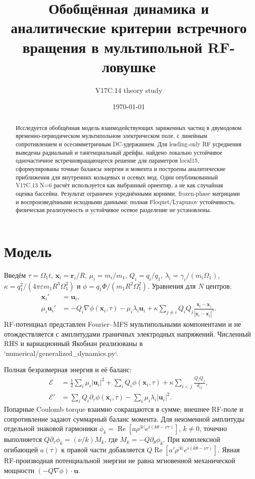\documentclass[11pt,a4paper]{article}
\title{Обобщённая динамика и аналитические критерии встречного вращения в мультипольной RF-ловушке}
\author{V17C.14 theory study}
\date{\today}
\begin{document}
\maketitle

\begin{abstract}
Исследуется обобщённая модель взаимодействующих заряженных частиц в двумодовом временно-периодическом мультипольном электрическом поле, с линейным сопротивлением и осесимметричным DC-удержанием. Для leading-only RF усреднения выведены радиальный и тангенциальный дрейфы, найдено локально устойчивое одночастичное встречновращающееся решение для параметров local15, сформулированы точные балансы энергии и момента и построены аналитические приближения для внутренних кольцевых и осевых мод. Один опубликованный V17C.13 N=6 расчёт используется как выбранный ориентир, а не как случайная оценка бассейна. Результат ограничен усреднёнными корнями, frozen-phase матрицами и воспроизведёнными исходными данными: полная Floquet/Lyapunov устойчивость, физическая реализуемость и устойчивое осевое разделение не установлены.
\end{abstract}

\section{Модель}
Введём \(\tau=\Omega_1t\), \(\bm x_i=\bm r_i/R\), \(\mu_i=m_i/m_1\), \(Q_i=q_i/q_1\), \(\lambda_i=\gamma_i/(m_i\Omega_1)\), \(\kappa=q_1^2/(4\pi\varepsilon m_1R^3\Omega_1^2)\) и \(\phi=q_1\Phi/(m_1R^2\Omega_1^2)\). Уравнения для \(N\) центров:
\begin{align}
\bm x_i'&=\bm u_i,\\
\mu_i\bm u_i'&=-Q_i\nabla\phi(\bm x_i,\tau)-\mu_i\lambda_i\bm u_i+
\kappa\sum_{j\ne i}Q_iQ_j\frac{\bm x_i-\bm x_j}{|\bm x_i-\bm x_j|^3}.
\end{align}
RF-потенциал представлен Fourier--MFS мультипольными компонентами и не отождествляется с амплитудами граничных электродных напряжений. Численный RHS и вариационный Якобиан реализованы в `numerical/generalized_dynamics.py`.

Полная безразмерная энергия и её баланс:
\begin{align}
\mathcal E&=\frac12\sum_i\mu_i|\bm u_i|^2+\sum_iQ_i\phi(\bm x_i,\tau)+\kappa\sum_{i<j}\frac{Q_iQ_j}{d_{ij}},\\
\mathcal E'&=\sum_iQ_i\partial_\tau\phi(\bm x_i,\tau)-\sum_i\mu_i\lambda_i|\bm u_i|^2.
\end{align}
Попарные Coulomb torque взаимно сокращаются в сумме; внешнее RF-поле и сопротивление задают суммарный баланс момента.
Для неизменной амплитуды отдельной знаковой гармоники \(\phi_k=\operatorname{Re}[a\rho^{|k|}e^{i(k\theta-\nu\tau)}]\), \(k\ne0\), точечно выполняется \(Q\partial_\tau\phi_k=(\nu/k)M_k\), где \(M_k=-Q\partial_\theta\phi_k\). При комплексной огибающей \(a(\tau)\) к правой части добавляется \(Q\operatorname{Re}[a'\rho^{|k|}e^{i(k\theta-\nu\tau)}]\). Явная RF-производная потенциальной энергии не равна мгновенной механической мощности \((-Q\nabla\phi)\cdot\bm u\).
\end{document}

